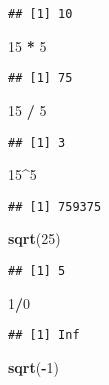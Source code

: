 \documentclass[]{article}
\newenvironment{Shaded}{\begin{snugshade}}{\end{snugshade}}
\newcommand{\KeywordTok}[1]{\textcolor[rgb]{0.13,0.29,0.53}{\textbf{#1}}}
\newcommand{\DecValTok}[1]{\textcolor[rgb]{0.00,0.00,0.81}{#1}}
\newcommand{\StringTok}[1]{\textcolor[rgb]{0.31,0.60,0.02}{#1}}
\newcommand{\OperatorTok}[1]{\textcolor[rgb]{0.81,0.36,0.00}{\textbf{#1}}}
\newcommand{\NormalTok}[1]{#1}
\begin{document}
\begin{verbatim}
## [1] 10
\end{verbatim}

\begin{Shaded}
\begin{Highlighting}[]
\DecValTok{15} \OperatorTok{*}\StringTok{ }\DecValTok{5}
\end{Highlighting}
\end{Shaded}

\begin{verbatim}
## [1] 75
\end{verbatim}

\begin{Shaded}
\begin{Highlighting}[]
\DecValTok{15} \OperatorTok{/}\StringTok{ }\DecValTok{5}
\end{Highlighting}
\end{Shaded}

\begin{verbatim}
## [1] 3
\end{verbatim}

\begin{Shaded}
\begin{Highlighting}[]
\DecValTok{15}\OperatorTok{^}\DecValTok{5}
\end{Highlighting}
\end{Shaded}

\begin{verbatim}
## [1] 759375
\end{verbatim}

\begin{Shaded}
\begin{Highlighting}[]
\KeywordTok{sqrt}\NormalTok{(}\DecValTok{25}\NormalTok{)}
\end{Highlighting}
\end{Shaded}

\begin{verbatim}
## [1] 5
\end{verbatim}

\begin{Shaded}
\begin{Highlighting}[]
\DecValTok{1}\OperatorTok{/}\DecValTok{0}
\end{Highlighting}
\end{Shaded}

\begin{verbatim}
## [1] Inf
\end{verbatim}

\begin{Shaded}
\begin{Highlighting}[]
\KeywordTok{sqrt}\NormalTok{(}\OperatorTok{-}\DecValTok{1}\NormalTok{)}
\end{Highlighting}
\end{Shaded}
\end{document}
